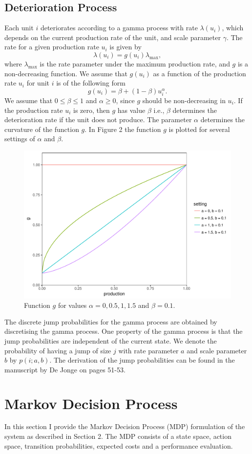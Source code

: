 \documentclass[a4paper,12pt]{article}
\begin{document}
\subsection{Deterioration Process}
Each unit $i$ deteriorates according to a gamma process with rate $\lambda(u_i)$, which depends on the current production rate of the unit, and scale parameter $\gamma$. The rate for a given production rate $u_i$ is given by
$$
\lambda(u_i) = g(u_i) \lambda_{\text{max}},
$$
where $\lambda_{\text{max}}$ is the rate parameter under the maximum production rate, and $g$ is a non-decreasing function. We assume that $g(u_i)$ as a function of the production rate $u_i$ for unit $i$ is of the following form
$$
g(u_i) = \beta + (1-\beta)u_i^\alpha.
$$
We assume that $0 \leq \beta \leq 1$ and $\alpha \geq 0$, since $g$ should be non-decreasing in $u_i$. If the production rate $u_i$ is zero, then $g$ has value $\beta$ i.e., $\beta$ determines the deterioration rate if the unit does not produce.  The parameter $\alpha$ determines the curvature of the function $g$. In Figure 2 the function $g$ is plotted for several settings of $\alpha$ and $\beta$. 

\begin{figure}[H]
	\centering
	\includegraphics[width=0.5\linewidth]{figures/g}
	\caption{Function $g$ for values $\alpha = 0, 0.5, 1, 1.5$ and $\beta = 0.1$.}
\end{figure}

The discrete jump probabilities for the gamma process are obtained by discretising the gamma process. One property of the gamma process is that the jump probabilities are independent of the current state. We denote the probability of having a jump of size $j$ with rate parameter $a$ and scale parameter $b$ by $p(i; a, b)$. The derivation of the jump probabilities can be found in the manuscript by De Jonge on pages 51-53.

\section{Markov Decision Process}
In this section I provide the Markov Decision Process (MDP) formulation of the system as described in Section 2. The MDP consists of a state space, action space, transition probabilities, expected costs and a performance evaluation.
\end{document}
